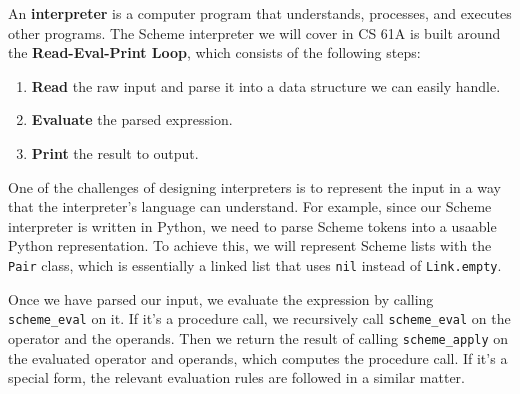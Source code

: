 An \textbf{interpreter} is a computer program that understands, processes, and executes other programs. The Scheme interpreter we will cover in CS 61A is built around the \textbf{Read-Eval-Print Loop}, which consists of the following steps:
\begin{enumerate}
    \item \textbf{Read} the raw input and parse it into a data structure we can easily handle. 
    \item \textbf{Evaluate} the parsed expression. 
    \item \textbf{Print} the result to output. 
\end{enumerate}

One of the challenges of designing interpreters is to represent the input in a way that the interpreter's language can understand.
For example, since our Scheme interpreter is written in Python, we need to parse Scheme tokens into a usaable Python representation.
To achieve this, we will represent Scheme lists with the \texttt{Pair} class, which is essentially a linked list that uses \texttt{nil} instead of \texttt{Link.empty}.

Once we have parsed our input, we evaluate the expression by calling \lstinline{scheme_eval} on it. If it's a procedure call, we recursively call \lstinline{scheme_eval} on the operator and the operands. Then we return the result of calling \lstinline{scheme_apply} on the evaluated operator and operands, which computes the procedure call. If it's a special form, the relevant evaluation rules are followed in a similar matter.

